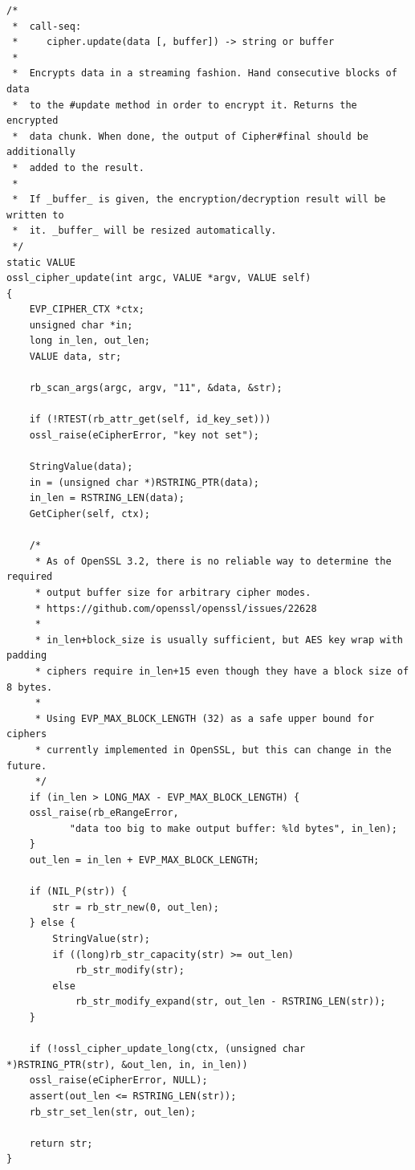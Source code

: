 \begin{lstlisting}[caption={Source code of \texttt{ossl\_cipher\_update}},label={lst:ossl_cipher_update_full}]
	    /*
 *  call-seq:
 *     cipher.update(data [, buffer]) -> string or buffer
 *
 *  Encrypts data in a streaming fashion. Hand consecutive blocks of data
 *  to the #update method in order to encrypt it. Returns the encrypted
 *  data chunk. When done, the output of Cipher#final should be additionally
 *  added to the result.
 *
 *  If _buffer_ is given, the encryption/decryption result will be written to
 *  it. _buffer_ will be resized automatically.
 */
static VALUE
ossl_cipher_update(int argc, VALUE *argv, VALUE self)
{
    EVP_CIPHER_CTX *ctx;
    unsigned char *in;
    long in_len, out_len;
    VALUE data, str;

    rb_scan_args(argc, argv, "11", &data, &str);

    if (!RTEST(rb_attr_get(self, id_key_set)))
	ossl_raise(eCipherError, "key not set");

    StringValue(data);
    in = (unsigned char *)RSTRING_PTR(data);
    in_len = RSTRING_LEN(data);
    GetCipher(self, ctx);

    /*
     * As of OpenSSL 3.2, there is no reliable way to determine the required
     * output buffer size for arbitrary cipher modes.
     * https://github.com/openssl/openssl/issues/22628
     *
     * in_len+block_size is usually sufficient, but AES key wrap with padding
     * ciphers require in_len+15 even though they have a block size of 8 bytes.
     *
     * Using EVP_MAX_BLOCK_LENGTH (32) as a safe upper bound for ciphers
     * currently implemented in OpenSSL, but this can change in the future.
     */
    if (in_len > LONG_MAX - EVP_MAX_BLOCK_LENGTH) {
	ossl_raise(rb_eRangeError,
		   "data too big to make output buffer: %ld bytes", in_len);
    }
    out_len = in_len + EVP_MAX_BLOCK_LENGTH;

    if (NIL_P(str)) {
        str = rb_str_new(0, out_len);
    } else {
        StringValue(str);
        if ((long)rb_str_capacity(str) >= out_len)
            rb_str_modify(str);
        else
            rb_str_modify_expand(str, out_len - RSTRING_LEN(str));
    }

    if (!ossl_cipher_update_long(ctx, (unsigned char *)RSTRING_PTR(str), &out_len, in, in_len))
	ossl_raise(eCipherError, NULL);
    assert(out_len <= RSTRING_LEN(str));
    rb_str_set_len(str, out_len);

    return str;
}
\end{lstlisting}


